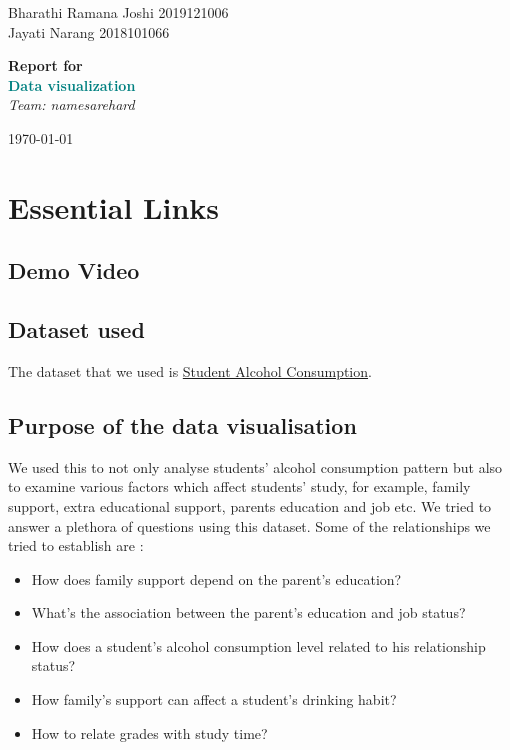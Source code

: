 \documentclass[titlepage, 12pt]{article}
\begin{document}
\begin{titlepage}

	\raggedleft

	\vspace*{\baselineskip}

	{Bharathi Ramana Joshi 2019121006\\Jayati Narang 2018101066}

	\vspace*{0.167\textheight}

	\textbf{\Large Report for}\\[\baselineskip]

	\textbf{\textcolor{teal}{\huge Data visualization}}\\[\baselineskip]

    {\large \textit{Team: namesarehard}}
    \vfill

    \today

	\raggedright

\end{titlepage}

\newpage

\tableofcontents

\newpage

\section{Essential Links}
\subsection{Demo Video}
\subsection{Dataset used} The dataset that we used is \href{https://www.kaggle.com/uciml/student-alcohol-consumption/data}{Student Alcohol Consumption}. 
\subsection{Purpose of the data visualisation}
We used this to not only analyse students' alcohol consumption pattern but also to examine various factors which affect students' study, for example, family support, extra educational support, parents education and job etc. We tried to answer a plethora of questions using this dataset.
Some of the relationships we tried to establish are :
\begin{itemize}
    \item How does family support depend on the parent's education?
    \item What's the association between the parent's education and job status?
    \item How does a student's alcohol consumption level related to his relationship status?
    \item How family's support can affect a student's drinking habit?
    \item How to relate grades with study time?

\end{itemize}
\end{document}
